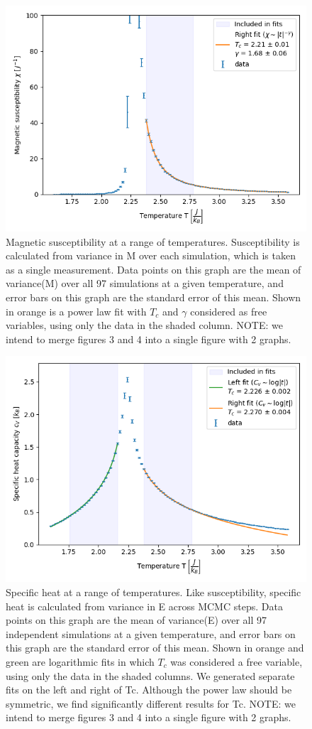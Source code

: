 \documentclass[letter,scriptaddress,twocolumn, prl,nofootinbib]{revtex4}
\begin{document}
\begin{figure}[h]
	\begin{center}
		\includegraphics[width=.4\textwidth]{figs/fig3_chi.png}
		\caption{Magnetic susceptibility at a range of temperatures. Susceptibility is calculated from variance in M over each simulation, which is taken as a single measurement. Data points on this graph are the mean of variance(M) over all 97 simulations at a given temperature, and error bars on this graph are the standard error of this mean. Shown in orange is a power law fit with $T_c$ and $\gamma$ considered as free variables, using only the data in the shaded column. NOTE: we intend to merge figures 3 and 4 into a single figure with 2 graphs.}
		\label{fig:fig3a}
	\end{center}
\end{figure}
\begin{figure}[h]
	\begin{center}
		\includegraphics[width=.4\textwidth]{figs/fig3_cv.png}
		\caption{Specific heat at a range of temperatures. Like susceptibility, specific heat is calculated from variance in E across MCMC steps. Data points on this graph are the mean of variance(E) over all 97 independent simulations at a given temperature, and error bars on this graph are the standard error of this mean. Shown in orange and green are logarithmic fits in which $T_c$ was considered a free variable, using only the data in the shaded columns. We generated separate fits on the left and right of Tc. Although the power law should be symmetric, we find significantly different results for Tc. NOTE: we intend to merge figures 3 and 4 into a single figure with 2 graphs.}
		\label{fig:fig3b}
	\end{center}
\end{figure}
\end{document}
